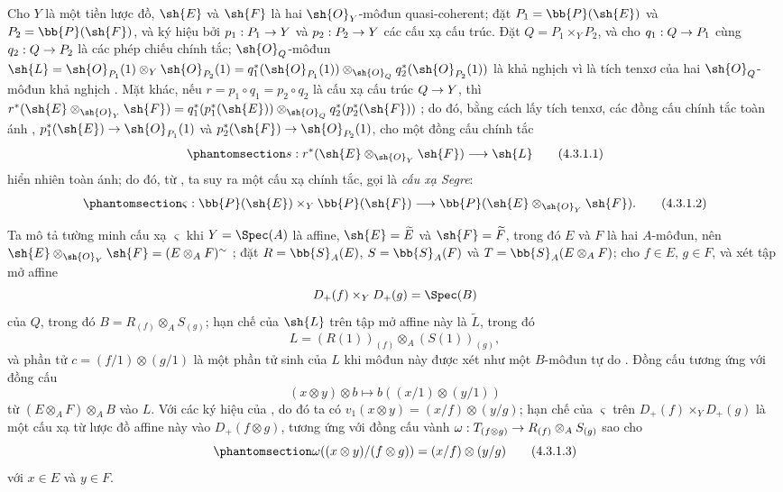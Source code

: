 \documentclass[oneside,10pt]{amsart}
\makeatletter
\newcommand{\ega@arrow}[2]{\mathchoice{#1}{#2}{#2}{#2}}
\renewcommand{\to}{\ega@arrow{\longrightarrow}{\rightarrow}}
\newcommand{\oldpage}[2][]{\marginnote{\normalfont\footnotesize\textbf{#1}~|~#2}\ignorespaces}
\let\EGAOriginalLabel\label
\renewcommand{\label}[1]{\phantomsection\EGAOriginalLabel{#1}}
\makeatother
\begin{document}
\begin{env}[4.3.1]
\label{II.4.3.1}
Cho $Y$ là một tiền lược đồ, $\sh{E}$ và $\sh{F}$ là hai $\sh{O}_Y$-môđun quasi-coherent;
đặt $P_1=\bb{P}(\sh{E})$ và $P_2=\bb{P}(\sh{F})$, và ký hiệu bởi $p_1:P_1\to Y$ và $p_2:P_2\to Y$ các cấu xạ cấu trúc.
Đặt $Q=P_1\times_Y P_2$, và cho $q_1:Q\to P_1$ cùng $q_2:Q\to P_2$ là các phép chiếu chính tắc;
$\sh{O}_Q$-môđun $\sh{L}=\sh{O}_{P_1}(1)\otimes_Y\sh{O}_{P_2}(1)=q_1^*(\sh{O}_{P_1}(1))\otimes_{\sh{O}_Q}q_2^*(\sh{O}_{P_2}(1))$ là khả nghịch vì là tích tenxơ của hai $\sh{O}_Q$-môđun khả nghịch .
Mặt khác, nếu $r=p_1\circ q_1=p_2\circ q_2$ là cấu xạ cấu trúc $Q\to Y$, thì $r^*(\sh{E}\otimes_{\sh{O}_Y}\sh{F})=q_1^*(p_1^*(\sh{E}))\otimes_{\sh{O}_Q}q_2^*(p_2^*(\sh{F}))$ ;
do đó, bằng cách lấy tích tenxơ, các đồng cấu chính tắc toàn ánh , $p_1^*(\sh{E})\to\sh{O}_{P_1}(1)$ và $p_2^*(\sh{F})\to\sh{O}_{P_2}(1)$, cho một đồng cấu chính tắc
\[
\label{II.4.3.1.1}
  s:r^*(\sh{E}\otimes_{\sh{O}_Y}\sh{F})\to\sh{L}
  \tag{4.3.1.1}
\]
hiển nhiên toàn ánh;
do đó, từ , ta suy ra một cấu xạ chính tắc, gọi là \emph{cấu xạ Segre}:
\[
\label{II.4.3.1.2}
  \varsigma:\bb{P}(\sh{E})\times_Y\bb{P}(\sh{F})\to\bb{P}(\sh{E}\otimes_{\sh{O}_Y}\sh{F}).
  \tag{4.3.1.2}
\]

Ta mô tả tường minh cấu xạ $\varsigma$ khi $Y=\Spec(A)$ là affine, $\sh{E}=\widetilde{E}$ và $\sh{F}=\widetilde{F}$, trong đó $E$ và $F$ là hai $A$-môđun, nên $\sh{E}\otimes_{\sh{O}_Y}\sh{F}=(E\otimes_A F)^\sim$ ;
đặt $R=\bb{S}_A(E)$, $S=\bb{S}_A(F)$ và $T=\bb{S}_A(E\otimes_A F)$;
cho $f\in E$, $g\in F$, và xét tập mở affine
\[
  D_+(f)\times_YD_+(g)=\Spec(B)
\]
\oldpage[II]{77}
của $Q$, trong đó $B=R_{(f)}\otimes_A S_{(g)}$;
hạn chế của $\sh{L}$ trên tập mở affine này là $\widetilde{L}$, trong đó
\[
  L=(R(1))_{(f)}\otimes_A(S(1))_{(g)},
\]
và phần tử $c=(f/1)\otimes(g/1)$ là một phần tử sinh của $L$ khi môđun này được xét như một $B$-môđun tự do .
Đồng cấu  tương ứng với đồng cấu
\[
  (x\otimes y)\otimes b\longmapsto b((x/1)\otimes(y/1))
\]
từ $(E\otimes_A F)\otimes_A B$ vào $L$.
Với các ký hiệu của , do đó ta có $v_1(x\otimes y)=(x/f)\otimes(y/g)$;
hạn chế của $\varsigma$ trên $D_+(f)\times_YD_+(g)$ là một cấu xạ từ lược đồ affine này vào $D_+(f\otimes g)$, tương ứng với đồng cấu vành $\omega:T_{(f\otimes g)}\to R_{(f)}\otimes_A S_{(g)}$ sao cho
\[
\label{II.4.3.1.3}
  \omega((x\otimes y)/(f\otimes g))=(x/f)\otimes(y/g)
  \tag{4.3.1.3}
\]
với $x\in E$ và $y\in F$.
\end{env}
\end{document}
